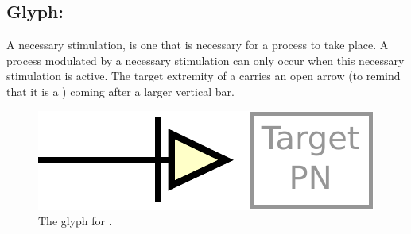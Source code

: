 

\subsection{Glyph: }\label{sec:necessary_stim}

A necessary stimulation, is one that is necessary for a process to take place. A process modulated by a necessary stimulation can only occur when this necessary stimulation is active. The target extremity of a  carries an open arrow (to remind that it is a ) coming after a larger vertical bar.

\begin{figure}[H]
  \centering
  \includegraphics[scale = 0.5]{images/necessary_stim}
  \caption{The \PD glyph for .}
  \label{fig:Necessary Stimulation}
\end{figure}
